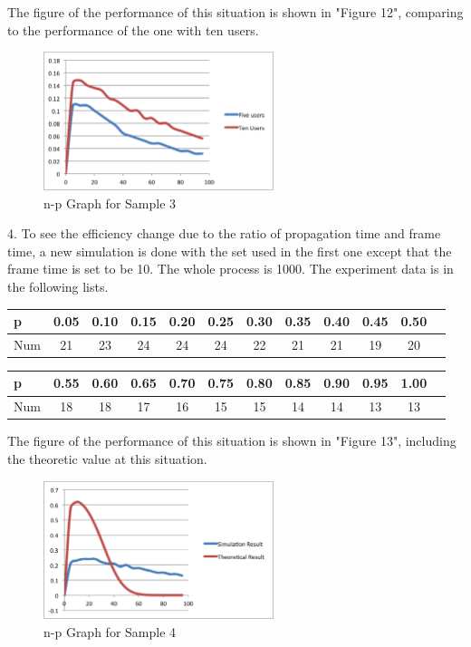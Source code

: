 \documentclass[11pt,a4paper]{report}
\begin{document}
The figure of the performance of this situation is shown in "Figure 12", comparing to the performance of the one with ten users. \\
\begin{figure}
\centering
\includegraphics[width=0.6\textwidth]{4_4.eps}
\caption{n-p Graph for Sample 3}
\end{figure}

4. To see the efficiency change due to the ratio of propagation time and frame time, a new simulation is done with the set used in the first one except that the frame time is set to be 10. The whole process is 1000. The experiment data is in the following lists. \\
\begin{table}[htbp]
\begin{tabular}{lccccccccccc}
\toprule
p & 0.05 & 0.10 & 0.15  & 0.20 & 0.25 & 0.30 & 0.35 & 0.40 & 0.45 & 0.50 \\
\midrule
Num & 21 & 23 & 24 & 24 & 24 & 22 & 21 & 21 & 19 & 20 \\
\bottomrule
\end{tabular}
\end{table}

\begin{table}[htbp]
\begin{tabular}{lccccccccccc}
\toprule
p & 0.55 & 0.60 & 0.65  & 0.70 & 0.75 & 0.80 & 0.85 & 0.90 & 0.95 & 1.00 \\
\midrule
Num & 18 & 18 & 17 & 16 & 15 & 15 & 14 & 14 & 13 & 13 \\
\bottomrule
\end{tabular}
\end{table}

The figure of the performance of this situation is shown in "Figure 13", including the theoretic value at this situation. \\
\begin{figure}
\centering
\includegraphics[width=0.6\textwidth]{4_5.eps}
\caption{n-p Graph for Sample 4}
\end{figure}
\end{document}
